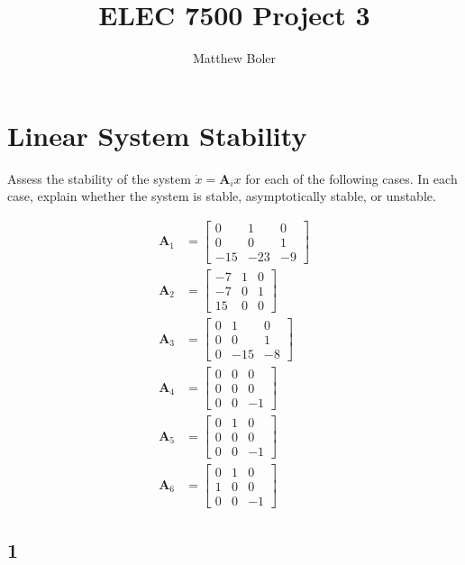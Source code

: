 \documentclass[]{article}
\title{ELEC 7500 Project 3}
\author{Matthew Boler}
\begin{document}
\maketitle

\section{Linear System Stability}
Assess the stability of the system $\dot{x} = \mathbf{A}_ix$ for each of the following cases.
In each case, explain whether the system is stable, asymptotically stable, or unstable.

\begin{align*}
	\mathbf{A}_1 &= \begin{bmatrix}
	0 & 1 & 0 \\
	0 & 0 & 1 \\
	-15 & -23 & -9
	\end{bmatrix} \\
	\mathbf{A}_2 &= \begin{bmatrix}
	-7 & 1 & 0 \\
	-7 & 0 & 1 \\
	15 & 0 & 0
	\end{bmatrix} \\
	\mathbf{A}_3 &= \begin{bmatrix}
	0 & 1 & 0 \\
	0 & 0 & 1 \\
	0 & -15 & -8
	\end{bmatrix} \\
	\mathbf{A}_4 &= \begin{bmatrix}
	0 & 0 & 0 \\
	0 & 0 & 0 \\
	0 & 0 & -1
	\end{bmatrix} \\
	\mathbf{A}_5 &= \begin{bmatrix}
	0 & 1 & 0 \\
	0 & 0 & 0 \\
	0 & 0 & -1
	\end{bmatrix} \\
	\mathbf{A}_6 &= \begin{bmatrix}
	0 & 1 & 0 \\
	1 & 0 & 0 \\
	0 & 0 & -1
	\end{bmatrix}
\end{align*}

\subsection{1}
\end{document}
